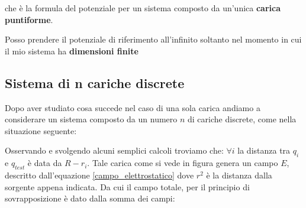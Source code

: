 che è la formula del potenziale per un sistema composto da un'unica \textbf{carica puntiforme}.

\begin{centering}
	\begin{tcolorbox}
	{Posso prendere il potenziale di riferimento all'infinito soltanto nel momento in cui il mio sistema ha \textbf{dimensioni finite}}
	\end{tcolorbox}
\end{centering}

\subsection{Sistema di n cariche discrete}
Dopo aver studiato cosa succede nel caso di una sola carica andiamo a considerare un sistema composto da un numero $n$ di cariche discrete, come nella situazione seguente: 

\begin{figure}[ht]
	\centering
\end{figure}

Osservando e svolgendo alcuni semplici calcoli troviamo che: $\forall i$ la distanza tra $q_i$ e $q_{test}$ è data da $R - r_i$. Tale carica come si vede in figura genera un campo $E$, descritto dall'equazione \ref{campo_elettrostatico} dove $r^2$ è la distanza dalla sorgente appena indicata. Da cui il campo totale, per il principio di sovrapposizione è dato dalla somma dei campi: 

